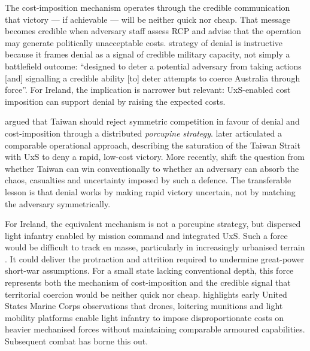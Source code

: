 The cost-imposition mechanism operates through the credible communication that victory --- if achievable --- will be neither quick nor cheap. That message becomes credible when adversary staff assess RCP and advise that the operation may generate politically unacceptable costs.  strategy of denial is instructive because it frames denial as a signal of credible military capacity, not simply a battlefield outcome: ``designed to deter a potential adversary from taking actions [and] signalling a credible ability [to] deter attempts to coerce Australia through force''. For Ireland, the implication is narrower but relevant: UxS-enabled cost imposition can support denial by raising the expected costs.


\textcite{MURRAY_2008} argued that Taiwan should reject symmetric competition in favour of denial and cost-imposition through a distributed \textit{porcupine strategy}. \textcite{paparo} later articulated a comparable operational approach, describing the saturation of the Taiwan Strait with UxS to deny a rapid, low-cost victory. More recently, \textcite{CSIS_Taiwan_ROC,pettyjohn} shift the question from whether Taiwan can win conventionally to whether an adversary can absorb the chaos, casualties and uncertainty imposed by such a defence. The transferable lesson is that denial works by making rapid victory uncertain, not by matching the adversary symmetrically.

For Ireland, the equivalent mechanism is not a porcupine strategy, but dispersed light infantry enabled by mission command and integrated UxS. Such a force would be difficult to track en masse, particularly in increasingly urbanised terrain \parencite[ii]{future_cities}. It could deliver the protraction and attrition required to undermine great-power short-war assumptions. For a small state lacking conventional depth, this force represents both the mechanism of cost-imposition and the credible signal that territorial coercion would be neither quick nor cheap. \textcite{Williams_2022_3_31} highlights early United States Marine Corps observations that drones, loitering munitions and light mobility platforms enable light infantry to impose disproportionate costs on heavier mechanised forces without maintaining comparable armoured capabilities. Subsequent combat has borne this out.

